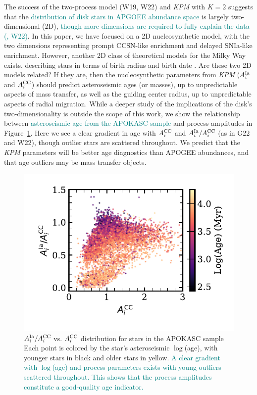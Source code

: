 \documentclass[modern]{aastex631}
\newcommand{\Acc}{A^{\rm CC}_{i}}
\newcommand{\AIa}{A^{\rm Ia}_{i}}
\newcommand{\add}[1]{\textcolor{teal}{#1}}
\newcommand{\name}{\textsl{KPM}}
\begin{document}
The success of the two-process model (W19, W22) and \name{} with $K=2$ suggests that the \add{distribution of disk stars in APGOEE abundance space} is largely two-dimensional (2D), \add{though more dimensions are required to fully explain the data (\citealp{ting2022}, W22)}. In this paper, we have focused on a 2D nucleosynthetic model, with the two dimensions representing prompt CCSN-like enrichment and delayed SNIa-like enrichment. However, another 2D class of theoretical models for the Milky Way exists, describing stars in terms of birth radius and birth date \citep[e.g.,][]{frankel2018, ness2022}. Are these two 2D models related? If they are, then the nucleosynthetic parameters from \name{} ($\AIa$ and $\Acc$) should predict asteroseismic ages (or masses), up to unpredictable aspects of mass transfer, as well as the guiding center radius, up to unpredictable aspects of radial migration. While a deeper study of the implications of the disk's two-dimensionality is outside the scope of this work, we show the relationship between \add{asteroseismic age from the APOKASC sample \citep{pinsonneault2018}} and process amplitudes in Figure~\ref{fig:age}. Here we see a clear gradient in age with $\Acc$ and $\AIa/\Acc$ (as in G22 and W22), though outlier stars are scattered throughout. We predict that the \name{} parameters will be better age diagnostics than APOGEE abundances, and that age outliers may be mass transfer objects. 

\begin{figure}[htb!]
    \centering
    \includegraphics[width=.6\textwidth]{Paper/Figures/AIaAcc_age.pdf}
    \caption{$\AIa/\Acc$ vs. $\Acc$ distribution for stars in the APOKASC sample \citep{pinsonneault2018} Each point is colored by the star's asteroseismic $\log$(age), with younger stars in black and older stars in yellow. \add{A clear gradient with $\log$(age) and process parameters exists with young outliers scattered throughout. This shows that the process amplitudes constitute a good-quality age indicator.}
    \label{fig:age}}
\end{figure}
\end{document}
